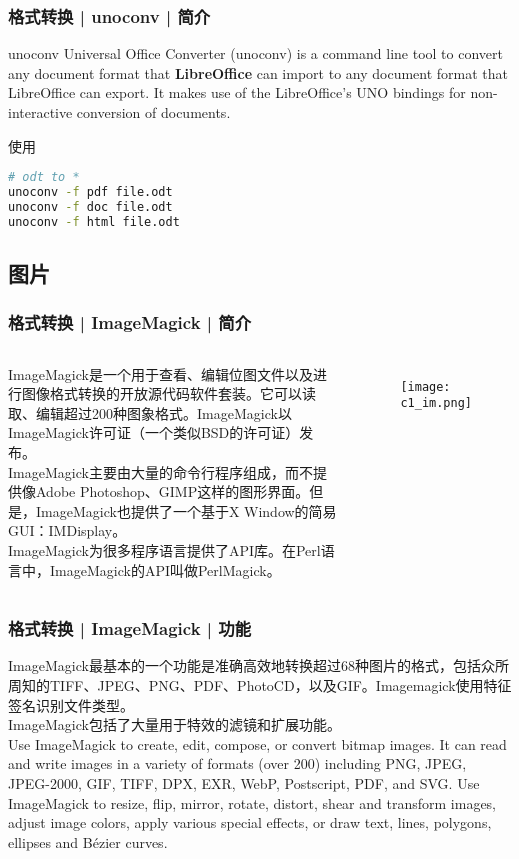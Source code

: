 \begin{frame}[fragile]
  \frametitle{格式转换 | unoconv | 简介}
  \begin{block}{unoconv}
    Universal Office Converter (unoconv) is a command line tool to convert any document format that \textbf{LibreOffice} can import to any document format that LibreOffice can export. It makes use of the LibreOffice’s UNO bindings for non-interactive conversion of documents.
  \end{block}
  \begin{block}{\alert{使用}}
\begin{lstlisting}[language=bash]
# odt to *
unoconv -f pdf file.odt
unoconv -f doc file.odt
unoconv -f html file.odt
\end{lstlisting}
  \end{block}
\end{frame}

\subsection{图片}
\begin{frame}
  \frametitle{格式转换 | ImageMagick | 简介}
  \begin{columns}
ImageMagick是一个用于查看、编辑位图文件以及进行图像格式转换的开放源代码软件套装。它可以读取、编辑超过200种图象格式。ImageMagick以ImageMagick许可证（一个类似BSD的许可证）发布。\\
\vspace{1em}
ImageMagick主要由大量的命令行程序组成，而不提供像Adobe Photoshop、GIMP这样的图形界面。但是，ImageMagick也提供了一个基于X Window的简易GUI：IMDisplay。\\
\vspace{1em}
ImageMagick为很多程序语言提供了API库。在Perl语言中，ImageMagick的API叫做PerlMagick。\\
  \begin{figure}
    \centering
    \texttt{[image: c1\_im.png]}
  \end{figure}
\end{columns}
\end{frame}

\begin{frame}
  \frametitle{格式转换 | ImageMagick | 功能}
ImageMagick最基本的一个功能是\alert{准确高效地转换超过68种图片的格式}，包括众所周知的TIFF、JPEG、PNG、PDF、PhotoCD，以及GIF。Imagemagick使用特征签名识别文件类型。\\
\vspace{1em}
ImageMagick包括了大量用于特效的滤镜和扩展功能。\\
\vspace{1em}
Use ImageMagick to create, edit, compose, or convert bitmap images. It can read and write images in a variety of formats (over 200) including PNG, JPEG, JPEG-2000, GIF, TIFF, DPX, EXR, WebP, Postscript, PDF, and SVG. Use ImageMagick to resize, flip, mirror, rotate, distort, shear and transform images, adjust image colors, apply various special effects, or draw text, lines, polygons, ellipses and Bézier curves.
\end{frame}

